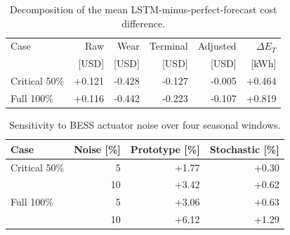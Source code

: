 \begin{table}[t]
\centering
\small
\caption{Decomposition of the mean LSTM-minus-perfect-forecast cost difference.}
\label{tab:forecast-decomposition}
\begin{tabular}{lrrrrr}
\toprule
Case & Raw & Wear & Terminal & Adjusted & $\Delta E_T$ \\
 & [USD] & [USD] & [USD] & [USD] & [kWh] \\
\midrule
Critical 50\% & +0.121 & -0.428 & -0.127 & -0.005 & +0.464 \\
Full 100\% & +0.116 & -0.442 & -0.223 & -0.107 & +0.819 \\
\bottomrule
\end{tabular}
\par\vspace{1mm}{\footnotesize Negative values favor LSTM. Wear is a component of raw cost; terminal adjustment is applied ex post. $\Delta E_T$ is the LSTM-minus-perfect terminal-energy difference.}
\end{table}

\begin{table}[t]
\centering
\small
\caption{Sensitivity to BESS actuator noise over four seasonal windows.}
\label{tab:robustness}
\begin{tabular}{lrrr}
\toprule
Case & Noise [\%] & Prototype [\%] & Stochastic [\%] \\
\midrule
Critical 50\% & 5 & +1.77 & +0.30 \\
 & 10 & +3.42 & +0.62 \\
Full 100\% & 5 & +3.06 & +0.63 \\
 & 10 & +6.12 & +1.29 \\
\bottomrule
\end{tabular}
\par\vspace{1mm}{\footnotesize Entries are mean operating-cost changes relative to each controller's noise-free base case.}
\end{table}
